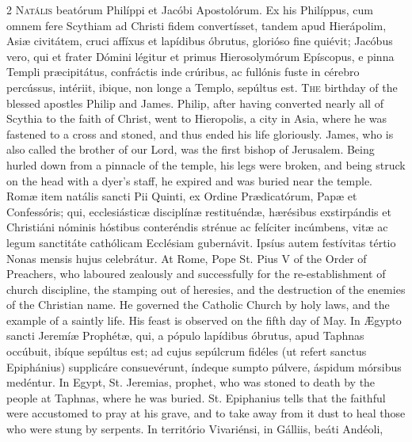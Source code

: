 \begin{paracol}{2}
\lettrine[lines=2]{N}{atális} beatórum Philíppi et Jacóbi Apostolórum. Ex 
 his Philíppus, cum omnem fere Scythiam ad Christi fidem convertísset, tandem 
 apud Hierápolim, Asiæ civitátem, cruci affíxus et lapídibus 
 óbrutus, glorióso fine quiévit; Jacóbus vero, qui et frater Dómini légitur et primus 
 Hierosolymórum Epíscopus, e pinna Templi præcipitátus, confráctis inde 
 crúribus, ac fullónis fuste in cérebro percússus, intériit, ibique, non 
 longe a Templo, sepúltus est.
\switchcolumn
{}
\lettrine[lines=2]{T}{he} birthday of the blessed apostles Philip and James. 
 Philip, after having converted nearly all of Scythia to the faith of Christ, 
 went to Hieropolis, a city in Asia, where he was fastened to a cross and 
 stoned, and thus ended his life gloriously. James, who is also called 
 the brother of our Lord, was the first bishop of Jerusalem. Being 
 hurled down from a pinnacle of the temple, his legs were broken, and being 
 struck on the head with a dyer's staff, he expired and was buried near the 
 temple.
\switchcolumn*
{}
Romæ item natális sancti Pii Quinti, ex Ordine 
 Prædicatórum, Papæ et Confessóris; qui, ecclesiásticæ disciplínæ restituéndæ, 
 hærésibus exstirpándis et Christiáni nóminis hóstibus conteréndis strénue ac 
 felíciter incúmbens, vitæ ac legum sanctitáte cathólicam Ecclésiam 
 gubernávit. Ipsíus autem festívitas tértio Nonas mensis hujus 
 celebrátur.
\switchcolumn
{}
At Rome, Pope St. Pius V of the Order of Preachers, who 
 laboured zealously and successfully for the re-establishment of church 
 discipline, the stamping out of heresies, and the destruction of the enemies 
 of the Christian name. He governed the Catholic Church by holy laws, 
 and the example of a saintly life. His feast is observed on the fifth 
 day of May.
\switchcolumn*
{}
In Ægypto sancti Jeremíæ Prophétæ, qui, a pópulo 
 lapídibus óbrutus, apud Taphnas occúbuit, ibíque sepúltus est; ad cujus 
 sepúlcrum fidéles (ut refert sanctus Epiphánius) supplicáre consuevérunt, 
 índeque sumpto púlvere, áspidum mórsibus medéntur.
\switchcolumn
{}
In Egypt, St. Jeremias, prophet, who was stoned to death 
 by the people at Taphnas, where he was buried. St. Epiphanius tells 
 that the faithful were accustomed to pray at his grave, and to take away 
 from it dust to heal those who were stung by serpents.
\switchcolumn*
{}
In território Vivariénsi, in Gálliis, beáti Andéoli, 

\end{paracol}
